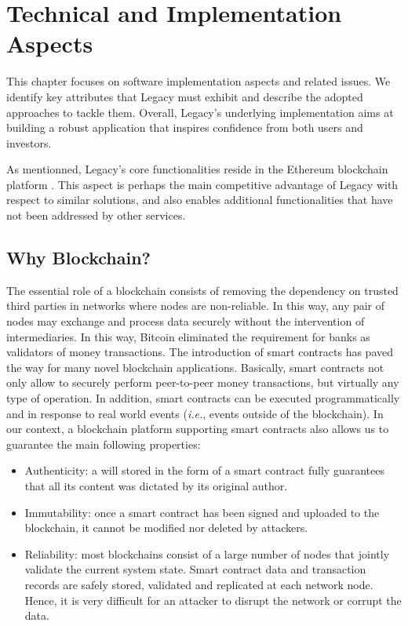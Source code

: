 \chapter{Technical and Implementation Aspects} %
\label{cha:implementation}

This chapter focuses on software implementation aspects and related issues. We identify key attributes that Legacy must exhibit and describe the adopted approaches to tackle them. Overall, Legacy’s underlying implementation aims at building a robust application that inspires confidence from both users and investors.

As mentionned, Legacy’s core functionalities reside in the Ethereum blockchain platform \cite{Ethereum}. This aspect is perhaps the main competitive advantage of Legacy with respect to similar solutions, and also enables additional functionalities that have not been addressed by other services. 

\section{Why Blockchain?} %
\label{sec:why_blockchain_}

The essential role of a blockchain consists of removing the dependency on trusted third parties in networks where nodes are non-reliable. In this way, any pair of nodes may exchange and process data securely without the intervention of intermediaries. In this way, Bitcoin eliminated the requirement for banks as validators of money transactions. The introduction of smart contracts has paved the way for many novel blockchain applications. Basically, smart contracts not only allow to securely perform peer-to-peer money transactions, but virtually any type of operation. In addition, smart contracts can be executed programmatically and in response to real world events (\textit{i.e.}, events outside of the blockchain). In our context, a blockchain platform supporting smart contracts also allows us to guarantee the main following properties: 

\begin{itemize}
	\item Authenticity: a will stored in the form of a smart contract fully guarantees that all its content was dictated by its original author.
	\item Immutability: once a smart contract has been signed and uploaded to the blockchain, it cannot be modified nor deleted by attackers.
	\item Reliability: most blockchains consist of a large number of nodes that jointly validate the current system state. Smart contract data and transaction records are safely stored, validated and replicated at each network node. Hence, it is very difficult for an attacker to disrupt the network or corrupt the data.
\end{itemize}

